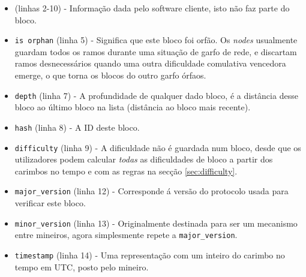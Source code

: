 \begin{itemize}
	\item (linhas 2-10) - Informação dada pelo software cliente, isto não faz parte do bloco. 
    \item {\tt is orphan} (linha 5) - Significa que este bloco foi orfão. Os {\em nodes} usualmente guardam todos os ramos durante uma situação de garfo de rede, e discartam ramos desnecessários quando uma outra dificuldade comulativa vencedora emerge, o que torna os blocos do outro garfo órfaos.
    \item {\tt depth} (linha 7) - A profundidade de qualquer dado bloco, é a distância desse bloco ao último bloco na lista (distância ao bloco mais recente).
    \item {\tt hash} (linha 8) - A ID deste bloco.
    \item {\tt difficulty} (linha 9) - A dificuldade não é guardada num bloco, desde que os utilizadores podem calcular {\em todas} as dificuldades de bloco a partir dos carimbos no tempo e com as regras na secção \ref{sec:difficulty}. 
    \item {\tt major\_version} (linha 12) - Corresponde á versão do protocolo usada para verificar este bloco.
    \item {\tt minor\_version} (linha 13) - Originalmente destinada para ser um mecanismo entre mineiros, agora simplesmente repete a {\tt major\_version}. 
    \item {\tt timestamp} (linha 14) - Uma representação com um inteiro do carimbo no tempo em UTC, posto pelo mineiro.

\end{itemize}
